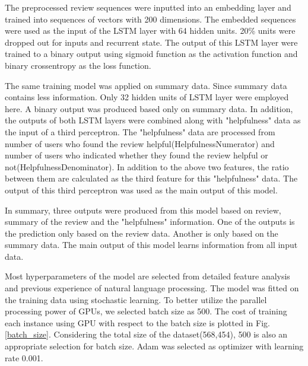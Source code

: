 \documentclass[letterpaper]{article} %
\begin{document}
The preprocessed review sequences were inputted into an embedding layer and trained into sequences of vectors with 200 dimensions. The embedded sequences were used as the input of the LSTM layer with 64 hidden units. 20\% units were dropped out for inputs and recurrent state. The output of this LSTM layer were trained to a binary output using sigmoid function as the activation function and binary crossentropy as the loss function. 

The same training model was applied on summary data. Since summary data contains less information. Only 32 hidden units of LSTM layer were employed here. A binary output was produced based only on summary data.
In addition, the outputs of both LSTM layers were combined along with "helpfulness" data as the input of a third perceptron. The "helpfulness" data are processed from number of users who found the review helpful(HelpfulnessNumerator) and number of users who indicated whether they found the review helpful or not(HelpfulnessDenominator). In addition to the above two features, the ratio between them are calculated as the third feature for this "helpfulness" data. The output of this third perceptron was used as the main output of this model.

In summary, three outputs were produced from this model based on review, summary of the review and the "helpfulness" information. One of the outputs is the prediction only based on the review data. Another is only based on the summary data. The main output of this model learns information from all input data. 

Most hyperparameters of the model are selected from detailed feature analysis and previous experience of natural language processing. The model was fitted on the training data using stochastic learning. To better utilize the parallel processing power of GPUs, we selected batch size as 500. The cost of training each instance using GPU with respect to the batch size is plotted in Fig.\ref{batch_size}. Considering the total size of the dataset(568,454), 500 is also an appropriate selection for batch size. Adam was selected as optimizer with learning rate 0.001.
\end{document}
